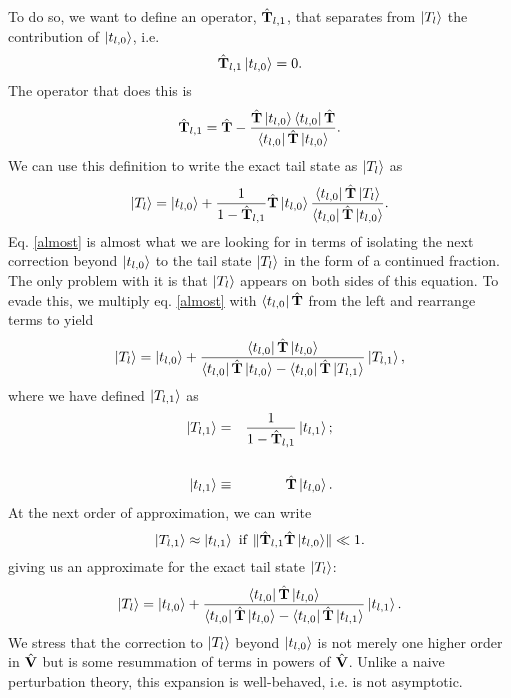 \documentclass[twocolumn,secnumarabic,amssymb, nobibnotes, aps, prd]{revtex4-2}
\newcommand{\Ht}{{\hat {\bf T}}}
\newcommand{\kts}[1]{\ket{t_{l,#1}}}
\newcommand{\bts}[1]{\bra{t_{l,#1}}}
\newcommand{\kTs}[1]{\ket{T_{l,#1}}}
\newcommand{\HT}[1]{\hat{\bf T}_{l,#1}}
\newcommand{\V}{\hat{\bf V}}
\begin{document}
To do so, we want to define an operator, $\HT{1}$, that separates from $\ket{T_l}$ the contribution of $\kts{0}$, i.e.
\begin{equation}
    \HT{1}\ket{t_{l,0}} = 0.
\end{equation}
The operator that does this is
\begin{eqnarray}
\HT{1} = \Ht - \frac{\Ht \kts{0}\bts{0} \Ht}{\bts{0} \Ht \kts{0}}.
\end{eqnarray}
We can use this definition to write the exact tail state as $\ket{T_l}$ as
\begin{equation}\label{almost}
    \ket{T_l} = \kts{0} + \frac{1}{1-\HT{1}}\Ht\kts{0}\frac{\bts{0}\Ht\ket{T_l}}{\bts{0}\Ht\kts{0}}.
\end{equation}
Eq. \eqref{almost} is almost what we are looking for in terms of isolating the next correction beyond $\kts{0}$ to the tail state $\ket{T_l}$ in the form of a continued fraction. The only problem with it is that $\ket{T_l}$ appears on both sides of this equation. To evade this, we multiply eq. \eqref{almost} with $\bts{0}\Ht$ from the left and rearrange terms to yield
\begin{equation} \label{ts1}
    \ket{T_l} = \kts{0} + \frac{\bts{0}\Ht\kts{0}}{\bts{0}\Ht\kts{0}-\bts{0}\Ht\kTs{1}}\kTs{1},
\end{equation}
where we have defined $\kTs{1}$ as
\begin{eqnarray}
\kTs{1} &=& \frac{1}{1-\HT{1}}\kts{1}; \cr\cr
\kts{1} &\equiv& \Ht\kts{0}.
\end{eqnarray}
At the next order of approximation, we can write
\begin{equation}
    \kTs{1} \approx \kts{1} ~{\rm if}~\lVert\HT{1}\Ht\kts{0}\rVert \ll 1.
\end{equation}
giving us an approximate for the exact tail state $\ket{T_l}$:
\begin{equation}
       \ket{T_l} = \kts{0} + \frac{\bts{0}\Ht\kts{0}}{\bts{0}\Ht\kts{0}-\bts{0}\Ht\kts{1}}\kts{1}.
\end{equation}
We stress that the correction to $\ket{T_l}$ beyond $\kts{0}$ is not merely one higher order in $\V$ but is some resummation of terms in powers of $\V$.  Unlike a naive perturbation theory, this expansion is well-behaved, i.e. is not asymptotic.  
\end{document}
